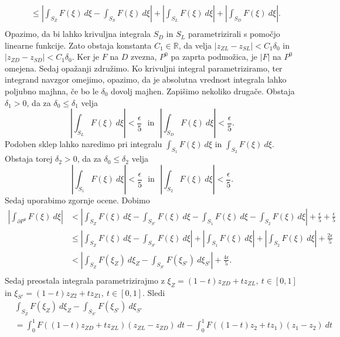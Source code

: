 \documentclass[mat1, tisk]{fmfdelo}
\begin{document}
\begin{dokaz}
\begin{align*}
            & \leq \left|\int_{S_Z}{F(\xi)~d\xi} - \int_{S_S}{F(\xi)~d\xi} \right| + \left|\int_{S_L}{F(\xi)~d\xi}\right| + \left|\int_{S_D}{F(\xi)~d\xi}\right|.\\
        \end{align*}
        Opazimo, da bi lahko krivuljna integrala $S_D$ in $S_L$ parametrizirali s pomočjo linearne funkcije. Zato obstaja konstanta $C_1 \in \mathbb{R}$, da velja $|z_{ZL} - z_{SL}| < C_1 \delta_0$ in  \mbox{$|z_{ZD} - z_{SD}| < C_1 \delta_0$}.
        Ker je $F$ na $D$ zvezna, $P^0$ pa zaprta podmožica, je $|F|$ na $P^0$ omejena. Sedaj opažanji združimo. Ko krivuljni integral parametriziramo, ter integrand navzgor omejimo, opazimo, da je absolutna vrednost integrala lahko poljubno majhna, če bo le $\delta_0$ dovolj majhen. 
        Zapišimo nekoliko drugače. Obstaja $\delta_1 > 0$, da za $\delta_0 \leq \delta_1$ velja
        $$ 
        \left|\int_{S_L}{F(\xi)~d\xi}\right| < \frac{\epsilon}{5}~~~\text{in}~~~\left|\int_{S_D}{F(\xi)~d\xi}\right| < \frac{\epsilon}{5}.
        $$
        Podoben sklep lahko naredimo pri integralu $\int_{S_1}{F(\xi)~d\xi}$ in $\int_{S_2}{F(\xi)~d\xi}$. Obstaja torej $\delta_2 > 0$, da za $\delta_0 \leq \delta_2$ velja
        $$ 
        \left|\int_{S_1}{F(\xi)~d\xi}\right| < \frac{\epsilon}{5}~~~\text{in}~~~\left|\int_{S_2}{F(\xi)~d\xi}\right| < \frac{\epsilon}{5}.
        $$
        Sedaj uporabimo zgornje ocene. Dobimo
        \begin{align*}
            \left|\int_{\partial P^0}{F(\xi)~d\xi}\right|&< \left|\int_{S_Z}{F(\xi)~d\xi} - \int_{S_{S'}}{F(\xi)~d\xi} - \int_{S_1}{F(\xi)~d\xi} - \int_{S_2}{F(\xi)~d\xi}\right| + \frac{\epsilon}{5} +  \frac{\epsilon}{5}\\
            & \leq \left|\int_{S_Z}{F(\xi)~d\xi} - \int_{S_{S'}}{F(\xi)~d\xi}\right| + \left|\int_{S_1}{F(\xi)~d\xi}\right| + \left|\int_{S_2}{F(\xi)~d\xi}\right| + \frac{2\epsilon}{5}\\
            & < \left|\int_{S_Z}{F(\xi_Z)~d\xi_Z} - \int_{S_{S'}}{F(\xi_{S'})~d\xi_{S'}}\right| + \frac{4\epsilon}{5}.\\
        \end{align*}
        Sedaj preostala integrala parametrizirajmo z $\xi_Z = (1 -t)z_{ZD} + t z_{ZL},~t \in [0,1]$ in $\xi_{S'} = (1 -t)z_{Z2} + t z_{Z1},~t \in [0,1]$.
        Sledi
        \begin{align*}
            &\int_{S_Z}{F(\xi_Z)~d\xi_Z} - \int_{S_{S'}}{F(\xi_{S'})~d\xi_{S'}}\\
            &=\int_{0}^{1}{F((1 -t)z_{ZD} + t z_{ZL})(z_{ZL} - z_{ZD})~dt} - \int_{0}^{1}{F((1 -t)z_{2} + t z_{1})(z_{1} - z_{2})~dt}\\

\end{align*}
\end{dokaz}
\end{document}
